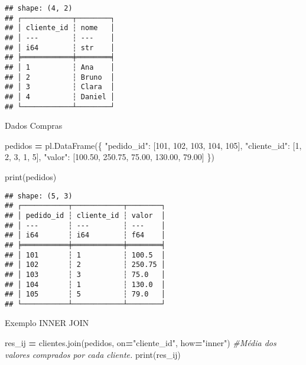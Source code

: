 \documentclass[
]{article}
\newenvironment{Shaded}{\begin{snugshade}}{\end{snugshade}}
\newcommand{\BuiltInTok}[1]{#1}
\newcommand{\CommentTok}[1]{\textcolor[rgb]{0.56,0.35,0.01}{\textit{#1}}}
\newcommand{\DecValTok}[1]{\textcolor[rgb]{0.00,0.00,0.81}{#1}}
\newcommand{\FloatTok}[1]{\textcolor[rgb]{0.00,0.00,0.81}{#1}}
\newcommand{\NormalTok}[1]{#1}
\newcommand{\OperatorTok}[1]{\textcolor[rgb]{0.81,0.36,0.00}{\textbf{#1}}}
\newcommand{\StringTok}[1]{\textcolor[rgb]{0.31,0.60,0.02}{#1}}
\begin{document}
\begin{verbatim}
## shape: (4, 2)
## ┌────────────┬────────┐
## │ cliente_id ┆ nome   │
## │ ---        ┆ ---    │
## │ i64        ┆ str    │
## ╞════════════╪════════╡
## │ 1          ┆ Ana    │
## │ 2          ┆ Bruno  │
## │ 3          ┆ Clara  │
## │ 4          ┆ Daniel │
## └────────────┴────────┘
\end{verbatim}

Dados Compras

\begin{Shaded}
\begin{Highlighting}[]
\NormalTok{pedidos }\OperatorTok{=}\NormalTok{ pl.DataFrame(\{}
    \StringTok{"pedido\_id"}\NormalTok{: [}\DecValTok{101}\NormalTok{, }\DecValTok{102}\NormalTok{, }\DecValTok{103}\NormalTok{, }\DecValTok{104}\NormalTok{, }\DecValTok{105}\NormalTok{],}
    \StringTok{"cliente\_id"}\NormalTok{: [}\DecValTok{1}\NormalTok{, }\DecValTok{2}\NormalTok{, }\DecValTok{3}\NormalTok{, }\DecValTok{1}\NormalTok{, }\DecValTok{5}\NormalTok{],}
    \StringTok{"valor"}\NormalTok{: [}\FloatTok{100.50}\NormalTok{, }\FloatTok{250.75}\NormalTok{, }\FloatTok{75.00}\NormalTok{, }\FloatTok{130.00}\NormalTok{, }\FloatTok{79.00}\NormalTok{]}
\NormalTok{\})}

\BuiltInTok{print}\NormalTok{(pedidos)}
\end{Highlighting}
\end{Shaded}

\begin{verbatim}
## shape: (5, 3)
## ┌───────────┬────────────┬────────┐
## │ pedido_id ┆ cliente_id ┆ valor  │
## │ ---       ┆ ---        ┆ ---    │
## │ i64       ┆ i64        ┆ f64    │
## ╞═══════════╪════════════╪════════╡
## │ 101       ┆ 1          ┆ 100.5  │
## │ 102       ┆ 2          ┆ 250.75 │
## │ 103       ┆ 3          ┆ 75.0   │
## │ 104       ┆ 1          ┆ 130.0  │
## │ 105       ┆ 5          ┆ 79.0   │
## └───────────┴────────────┴────────┘
\end{verbatim}

Exemplo INNER JOIN

\begin{Shaded}
\begin{Highlighting}[]
\NormalTok{res\_ij }\OperatorTok{=}\NormalTok{ clientes.join(pedidos, on}\OperatorTok{=}\StringTok{"cliente\_id"}\NormalTok{, how}\OperatorTok{=}\StringTok{"inner"}\NormalTok{) }\CommentTok{\#Média dos valores comprados por cada cliente.}
\BuiltInTok{print}\NormalTok{(res\_ij)}
\end{Highlighting}
\end{Shaded}
\end{document}
